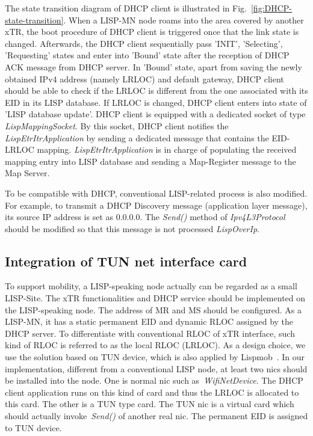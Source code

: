 The state transition diagram of DHCP client is illustrated in Fig.~\ref{fig:DHCP-state-transition}. When a LISP-MN node roams into the area covered by another xTR, the boot procedure of DHCP client is triggered once that the link state is changed. Afterwards, the DHCP client sequentially pass 'INIT', 'Selecting', 'Requesting' states and enter into 'Bound' state after the reception of DHCP ACK message from DHCP server. In 'Bound' state, apart from saving the newly obtained IPv4 address (namely LRLOC) and default gateway, DHCP client should be able to check if the LRLOC is different from the one associated with its EID in its LISP database. If LRLOC is changed, DHCP client enters into state of 'LISP database update'. DHCP client is equipped with a dedicated socket of type \emph{LispMappingSocket}. By this socket, DHCP client notifies the \emph{LispEtrItrApplication} by sending a dedicated message that contains the EID-LRLOC mapping. \emph{LispEtrItrApplication} is in charge of populating the received mapping entry into LISP database and sending a Map-Register message to the Map Server.

To be compatible with DHCP, conventional LISP-related process is also modified. For example, to transmit a DHCP Discovery message (application layer message), its source IP address is set as $0.0.0.0$. The \emph{Send()} method of \emph{Ipv4L3Protocol} should be modified so that this message is not processed \emph{LispOverIp}.

\subsection{Integration of TUN net interface card}
\label{subsec:tundevice}
To support mobility, a LISP-speaking node actually can be regarded as a small LISP-Site. The xTR functionalities and DHCP service should be implemented on the LISP-speaking node. The address of MR and MS should be configured. As a LISP-MN, it has a static permanent EID and dynamic RLOC assigned by the DHCP server. To differentiate with conventional RLOC of xTR interface, such kind of RLOC is referred to as the local RLOC (LRLOC). 
As a design choice, we use the solution based on TUN device, which is also applied by Lispmob~\cite{LISPmob}. In our implementation, different from a conventional LISP node, at least two \acrshort{nic}s should be installed into the node. One is normal \acrshort{nic} such as~\emph{WifiNetDevice}. The DHCP client application runs on this kind of card and thus the LRLOC is allocated to this card. The other is a TUN type card. The TUN \acrshort{nic} is a virtual card which should actually invoke~\emph{Send()} of another real \acrshort{nic}. The permanent EID is assigned to TUN device. 

